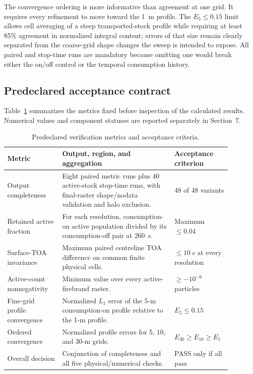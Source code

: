 The convergence ordering is more informative than agreement at one grid.  It
requires every refinement to move toward the \SI{1}{m} profile.  The
\(E_5\le0.15\) limit allows cell averaging of a steep transported-stock
profile while requiring at least 85\% agreement in normalized integral
content; errors of that size remain clearly separated from the coarse-grid
shape changes the sweep is intended to expose.  All paired and stop-time runs
are mandatory because omitting one would break either the on/off control or
the temporal consumption history.

\subsection{Predeclared acceptance contract}

Table~\ref{tab:acceptance-contract} summarizes the metrics fixed before
inspection of the calculated results. Numerical values and component statuses
are reported separately in Section~7.

\begin{table}[H]
\centering
\footnotesize
\caption{Predeclared verification metrics and acceptance criteria.}
\label{tab:acceptance-contract}
\begin{tabular}{@{}p{0.23\linewidth}p{0.47\linewidth}p{0.21\linewidth}@{}}
\toprule
Metric & Output, region, and aggregation & Acceptance criterion\\
\midrule
Output completeness & Eight paired metric runs plus 40 active-stock stop-time runs, with final-raster shape/nodata validation and halo exclusion. & 48 of 48 variants \\
Retained active fraction & For each resolution, consumption-on active population divided by its consumption-off pair at \SI{260}{s}. & Maximum \(\le0.04\) \\
Surface-TOA invariance & Maximum paired centreline TOA difference on common finite physical cells. & \(\le\SI{10}{s}\) at every resolution \\
Active-count nonnegativity & Minimum value over every active-firebrand raster. & \(\ge-10^{-6}\) particles \\
Fine-grid profile convergence & Normalized \(L_1\) error of the 5-m consumption-on profile relative to the 1-m profile. & \(E_5\le0.15\) \\
Ordered convergence & Normalized profile errors for 5, 10, and 30-m grids. & \(E_{30}\ge E_{10}\ge E_5\) \\
Overall decision & Conjunction of completeness and all five physical/numerical checks. & PASS only if all pass \\
\bottomrule
\end{tabular}
\end{table}

